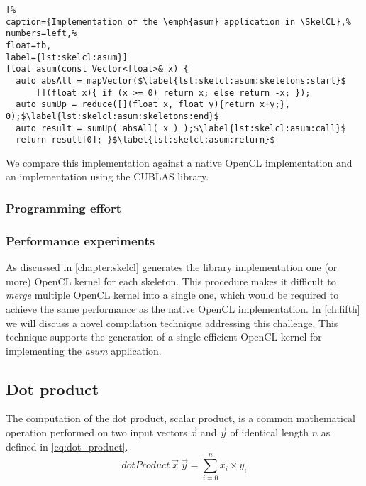 \begin{lstlisting}[%                                                             
caption={Implementation of the \emph{asum} application in \SkelCL},%
numbers=left,%
float=tb,
label={lst:skelcl:asum}]
float asum(const Vector<float>& x) {
  auto absAll = mapVector($\label{lst:skelcl:asum:skeletons:start}$
      [](float x){ if (x >= 0) return x; else return -x; });
  auto sumUp = reduce([](float x, float y){return x+y;}, 0);$\label{lst:skelcl:asum:skeletons:end}$
  auto result = sumUp( absAll( x ) );$\label{lst:skelcl:asum:call}$
  return result[0]; }$\label{lst:skelcl:asum:return}$
\end{lstlisting}

We compare this implementation against a native OpenCL implementation and an implementation using the CUBLAS library.

\subsubsection*{Programming effort}

\subsubsection*{Performance experiments}

As discussed in \autoref{chapter:skelcl} generates the \SkelCL library implementation one (or more) OpenCL kernel for each skeleton.
This procedure makes it difficult to \emph{merge} multiple OpenCL kernel into a single one, which would be required to achieve the same performance as the native OpenCL implementation.
In \autoref{ch:fifth} we will discuss a novel compilation technique addressing this challenge.
This technique supports the generation of a single efficient OpenCL kernel for implementing the \emph{asum} application.

\subsection{Dot product}
\label{sec:dot}
The computation of the dot product, \aka scalar product, is a common mathematical operation performed on two input vectors $\vec{x}$ and $\vec{y}$ of identical length $n$ as defined in \autoref{eq:dot_product}.
\begin{equation}
  dotProduct\ \vec{x}\ \vec{y} = \sum_{i=0}^{n} x_i \times y_i
  \label{eq:dot_product}
\end{equation}

